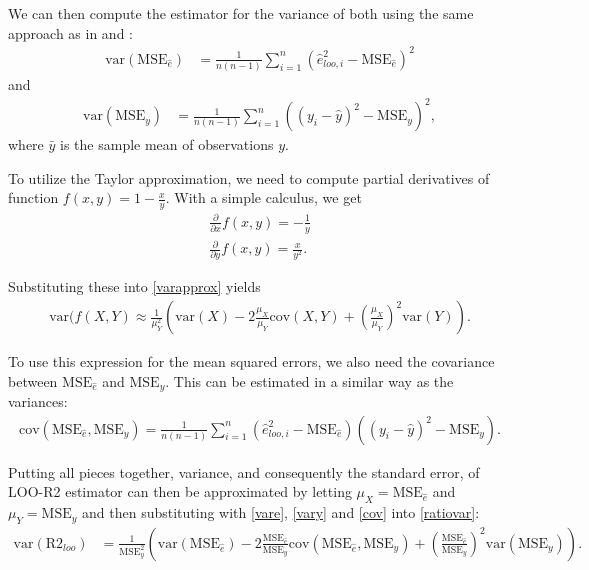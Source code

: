 \documentclass{article}
\begin{document}
We can then compute the estimator for the variance of both using the same approach as in \cite{sivula_uncertainty_2022} and \cite{vehtari_practical_2016}:
\begin{align}
    \text{var}(\text{MSE}_{\hat{e}}) &= \frac{1}{n (n-1)} \sum_{i = 1}^n \left( \hat{e}_{loo, i}^2 - \text{MSE}_{\hat{e}} \right)^2 \label{vare}
\end{align}
and
\begin{align}
    \text{var}(\text{MSE}_y) &= \frac{1}{n (n-1)} \sum_{i = 1}^n \left( (y_i - \hat{y})^2 -\text{MSE}_y \right)^2 \label{vary},
\end{align}
where $\bar{y}$ is the sample mean of observations $y$. 

To utilize the Taylor approximation, we need to compute partial derivatives of function $f(x,y) = 1 - \frac{x}{y}$. With a simple calculus, we get
\begin{align}
    \frac{\partial}{\partial x}f(x,y) = -\frac{1}{y} \\
    \frac{\partial}{\partial y}f(x,y) = \frac{x}{y^2}.
\end{align}

Substituting these into \eqref{varapprox} yields
\begin{align}
    \text{var}(f(X, Y) \approx \frac{1}{\mu_Y^2} \left( \text{var}(X) - 2 \frac{\mu_X}{\mu_Y} \text{cov}(X,Y) + \left( \frac{\mu_X}{\mu_Y} \right)^2 \text{var}(Y) \right) \label{ratiovar}.
\end{align}

 To use this expression for the mean squared errors, we also need the covariance between $\text{MSE}_{\hat{e}}$ and $\text{MSE}_y$. This can be estimated in a similar way as the variances:
 \begin{align}
     \text{cov}(\text{MSE}_{\hat{e}}, \text{MSE}_{y} ) = \frac{1}{n (n -1 )} \sum_{i = 1}^n \left( \hat{e}_{loo, i}^2 - \text{MSE}_{\hat{e}} \right) \left( (y_i - \hat{y})^2 -\text{MSE}_y \right) \label{cov}.
 \end{align}
 
 Putting all pieces together, variance, and consequently the standard error, of LOO-R2 estimator can then be approximated by letting $\mu_X = \text{MSE}_{\hat{e}}$ and $\mu_Y = \text{MSE}_y$ and then substituting with \eqref{vare}, \eqref{vary} and \eqref{cov} into \eqref{ratiovar}:
 \begin{align}
     \text{var}(\text{R2}_{loo}) &= \frac{1}{\text{MSE}_y^2} \left( \text{var}(\text{MSE}_{\hat{e}}) - 2 \frac{\text{MSE}_{\hat{e}}}{\text{MSE}_y} \text{cov}(\text{MSE}_{\hat{e}}, \text{MSE}_{y} ) +  \left( \frac{\text{MSE}_{\hat{e}}}{\text{MSE}_y} \right)^2 \text{var}(\text{MSE}_y) \right) \label{eq:loor2-se}.
 \end{align}
 
\end{document}
